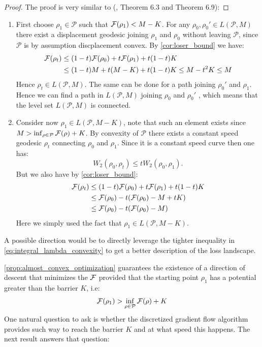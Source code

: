 %
\begin{proof}
The proof is very similar to (\cite{Bottou:2017}, Theorem 6.3 and
Theorem 6.9): 
\end{proof}
\begin{enumerate}
\item First choose $\rho_{1}\in\mathcal{P}$ such that ${{\mathcal F}}(\rho_{1})<M-K$.
For any $\rho_{0},\rho_{0}'\in L(\mathcal{P},M)$ there exist a displacement
geodesic joining $\rho_{1}$ and $\rho_{0}$ without leaving $\mathcal{P}$,
since $\mathcal{P}$ is by assumption discplacement convex. By \ref{cor:loser_bound}
we have:
\begin{align*}
{{\mathcal F}}(\rho_{t}) & \leq(1-t){{\mathcal F}}(\rho_{0})+t{{\mathcal F}}(\rho_{1})+t(1-t)K\\
 & \leq(1-t)M+t(M-K)+t(1-t)K\leq M-t^{2}K\leq M
\end{align*}
Hence $\rho_{t}\in L(\mathcal{P},M)$. The same can be done for a
path joining $\rho_{0}'$ and $\rho_{1}$. Hence we can find a path
in $L(\mathcal{P},M)$ joining $\rho_{0}$ and $\rho_{0}'$ , which
means that the level set $L(\mathcal{P},M)$ is connected.
\item Consider now $\rho_{1}\in L(\mathcal{P},M-K)$, note that such an
element exists since $M>\inf_{\rho\in\mathcal{P}}{{\mathcal F}}(\rho)+K$.
By convexity of $\mathcal{P}$ there exists a constant speed geodesic
$\rho_{t}$ connecting $\rho_{0}$ and $\rho_{1}$. Since it is a
constant speed curve then one has:
\[
W_{2}(\rho_{0},\rho_{t})\leq tW_{2}(\rho_{0},\rho_{1}).
\]
But we also have by \ref{cor:loser_bound}:
\begin{align*}
{{\mathcal F}}(\rho_{t}) & \leq(1-t){{\mathcal F}}(\rho_{0})+t{{\mathcal F}}(\rho_{1})+t(1-t)K\\
 & \leq {{\mathcal F}}(\rho_{0})-t({{\mathcal F}}(\rho_{0})-M+tK)\\
 & \leq {{\mathcal F}}(\rho_{0})-t({{\mathcal F}}(\rho_{0})-M)
\end{align*}
Here we simply used the fact that $\rho_{1}\in L(\mathcal{P},M-K)$. 
\end{enumerate}
%

\begin{remark}
	A possible direction would be to directly leverage the tighter inequality in \ref{eq:integral_lambda_convexity} to get a better description of the loss landscape.
\end{remark}

\ref{prop:almost_convex_optimization} guarantees the existence of a direction of descent that minimizes the ${{\mathcal F}}$ provided that the starting point $\rho_1$ has a potential greater than the barrier $K$, i.e:
\begin{align}\label{eq:barrier_condition}
	{{\mathcal F}}(\rho_1)> \inf_{\rho\in \mathcal{P}} {{\mathcal F}}(\rho) + K
\end{align}
One natural question to ask is whether the  discretized gradient flow algorithm provides such way to reach the barrier $K$ and at what speed this happens. The next result answers that question:   

